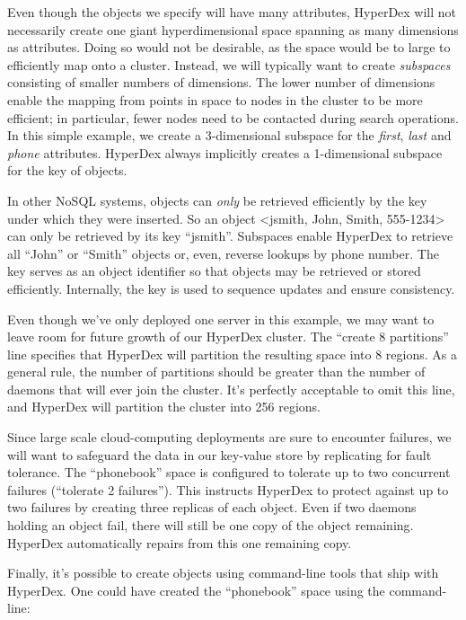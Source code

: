 Even though the objects we specify will have many attributes, HyperDex will not
necessarily create one giant hyperdimensional space spanning as many dimensions
as attributes.  Doing so would not be desirable, as the space would be to large
to efficiently map onto a cluster.  Instead, we will typically want to create
{\em subspaces} consisting of smaller numbers of dimensions. The lower number of
dimensions enable the mapping from points in space to nodes in the cluster to be
more efficient; in particular, fewer nodes need to be contacted during search
operations.  In this simple example, we create a 3-dimensional subspace for the
{\em first}, {\em last} and {\em phone} attributes.  HyperDex always implicitly
creates a 1-dimensional subspace for the key of objects.

In other NoSQL systems, objects can {\em only} be retrieved efficiently by the
key under which they were inserted.  So an object <jsmith, John, Smith,
555-1234> can only be retrieved by its key ``jsmith''.  Subspaces enable
HyperDex to retrieve all ``John'' or ``Smith'' objects or, even, reverse lookups
by phone number.  The key serves as an object identifier so that objects may be
retrieved or stored efficiently.  Internally, the key is used to sequence
updates and ensure consistency.

Even though we've only deployed one server in this example, we may want to leave
room for future growth of our HyperDex cluster.  The ``create 8 partitions''
line specifies that HyperDex will partition the resulting space into 8 regions.
As a general rule, the number of partitions should be greater than the number of
daemons that will ever join the cluster.  It's perfectly acceptable to omit this
line, and HyperDex will partition the cluster into 256 regions.

Since large scale cloud-computing deployments are sure to encounter failures, we
will want to safeguard the data in our key-value store by replicating for fault
tolerance.  The ``phonebook'' space is configured to tolerate up to two
concurrent failures (``tolerate 2 failures'').  This instructs HyperDex to
protect against up to two failures by creating three replicas of each object.
Even if two daemons holding an object fail, there will still be one copy of the
object remaining.  HyperDex automatically repairs from this one remaining copy.

Finally, it's possible to create objects using command-line tools that ship with
HyperDex.  One could have created the ``phonebook'' space using the
command-line:

